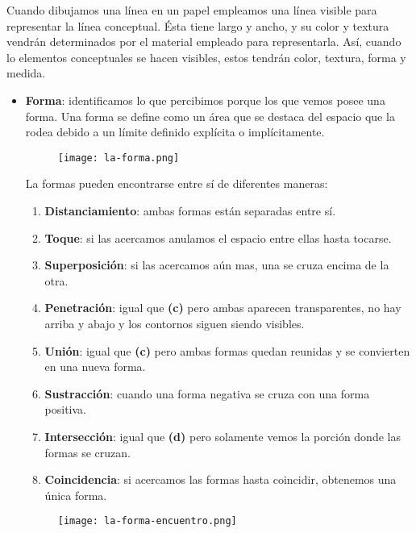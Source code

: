 Cuando dibujamos una línea en un papel empleamos una línea visible para representar la línea conceptual. Ésta tiene largo y ancho, y su color y textura vendrán determinados por el material empleado para representarla. Así, cuando lo elementos conceptuales se hacen visibles, estos tendrán color, textura, forma y medida.

\begin{itemize}
    \item \textbf{Forma}: identificamos lo que percibimos porque los que vemos posee una forma. Una forma se define como un área que se destaca del espacio que la rodea debido a un límite definido explícita o implícitamente.

    \begin{figure}[H]
        \centering
        \texttt{[image: la-forma.png]}
    \end{figure}

    La formas pueden encontrarse entre sí de diferentes maneras:

    \begin{enumerate}[label=(\alph*)]
        \item \textbf{Distanciamiento}: ambas formas están separadas entre sí.
        \item \textbf{Toque}: si las acercamos anulamos el espacio entre ellas hasta tocarse.
        \item \textbf{Superposición}: si las acercamos aún mas, una se cruza encima de la otra.
        \item \textbf{Penetración}: igual que \textbf{(c)} pero ambas aparecen transparentes, no hay arriba y abajo y los contornos siguen siendo visibles.
        \item \textbf{Unión}: igual que \textbf{(c)} pero ambas formas quedan reunidas y se convierten en una nueva forma.
        \item \textbf{Sustracción}: cuando una forma negativa se cruza con una forma positiva.
        \item \textbf{Intersección}: igual que \textbf{(d)} pero solamente vemos la porción donde las formas se cruzan.
        \item \textbf{Coincidencia}: si acercamos las formas hasta coincidir, obtenemos una única forma.
    \end{enumerate}

    \begin{figure}[H]
        \centering
        \texttt{[image: la-forma-encuentro.png]}
    \end{figure}


\end{itemize}
